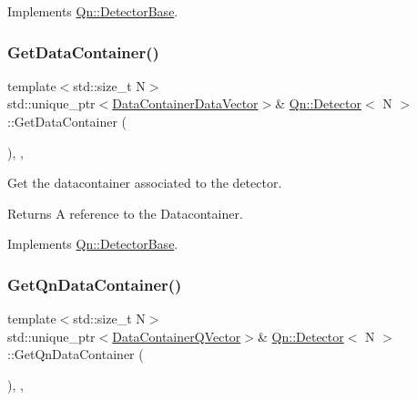 Implements \mbox{\hyperlink{classQn_1_1DetectorBase}{Qn\+::\+Detector\+Base}}.

\mbox{\label{classQn_1_1Detector_a3f08381bad2b1452a0209e420b99e989}} 
\subsubsection{\texorpdfstring{Get\+Data\+Container()}{GetDataContainer()}}
{\footnotesize\ttfamily template$<$std\+::size\+\_\+t N$>$ \\
std\+::unique\+\_\+ptr$<$\mbox{\hyperlink{classQn_1_1DataContainer}{Data\+Container\+Data\+Vector}}$>$\& \mbox{\hyperlink{classQn_1_1Detector}{Qn\+::\+Detector}}$<$ N $>$\+::Get\+Data\+Container (\begin{DoxyParamCaption}{ }\end{DoxyParamCaption})\hspace{0.3cm}{\ttfamily [inline]}, {\ttfamily [override]}, {\ttfamily [virtual]}}



Get the datacontainer associated to the detector. 

\begin{DoxyReturn}{Returns}
A reference to the Datacontainer. 
\end{DoxyReturn}


Implements \mbox{\hyperlink{classQn_1_1DetectorBase}{Qn\+::\+Detector\+Base}}.

\mbox{\label{classQn_1_1Detector_a9312033ff207a2caa762e895382f8456}} 
\subsubsection{\texorpdfstring{Get\+Qn\+Data\+Container()}{GetQnDataContainer()}}
{\footnotesize\ttfamily template$<$std\+::size\+\_\+t N$>$ \\
std\+::unique\+\_\+ptr$<$\mbox{\hyperlink{classQn_1_1DataContainer}{Data\+Container\+Q\+Vector}}$>$\& \mbox{\hyperlink{classQn_1_1Detector}{Qn\+::\+Detector}}$<$ N $>$\+::Get\+Qn\+Data\+Container (\begin{DoxyParamCaption}{ }\end{DoxyParamCaption})\hspace{0.3cm}{\ttfamily [inline]}, {\ttfamily [override]}, {\ttfamily [virtual]}}




